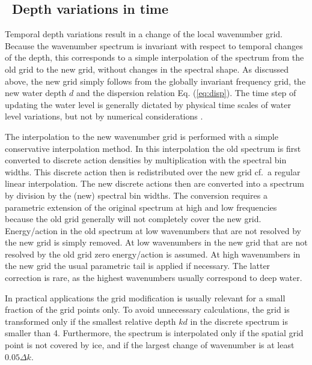 \vssub
\subsection{~Depth variations in time} \label{sub:num_depth}
\vssub

Temporal depth variations result in a change of the local wavenumber
grid. Because the wavenumber spectrum is invariant with respect to temporal
changes of the depth, this corresponds to a simple interpolation of the
spectrum from the old grid to the new grid, without changes in the spectral
shape. As discussed above, the new grid simply follows from the globally
invariant frequency grid, the new water depth $d$ and the dispersion relation
Eq. (\ref{eq:disp}). The time step of updating the water level is generally
dictated by physical time scales of water level variations, but not by
numerical considerations \citep{tol:GAOS98b}.

The interpolation to the new wavenumber grid is performed with a simple
conservative interpolation method. In this interpolation the old spectrum is
first converted to discrete action densities by multiplication with the
spectral bin widths. This discrete action then is redistributed over the new
grid cf.\ a regular linear interpolation. The new discrete actions then are
converted into a spectrum by division by the (new) spectral bin widths. The
conversion requires a parametric extension of the original spectrum at high
and low frequencies because the old grid generally will not completely cover
the new grid. Energy/action in the old spectrum at low wavenumbers that are
not resolved by the new grid is simply removed. At low wavenumbers in the new
grid that are not resolved by the old grid zero energy/action is assumed. At
high wavenumbers in the new grid the usual parametric tail is applied if
necessary. The latter correction is rare, as the highest wavenumbers usually
correspond to deep water.

In practical applications the grid modification is usually relevant for a
small fraction of the grid points only. To avoid unnecessary calculations, the
grid is transformed only if the smallest relative depth $kd$ in the discrete
spectrum is smaller than 4. Furthermore, the spectrum is interpolated only if
the spatial grid point is not covered by ice, and if the largest change of
wavenumber is at least $0.05 \Delta k$.
